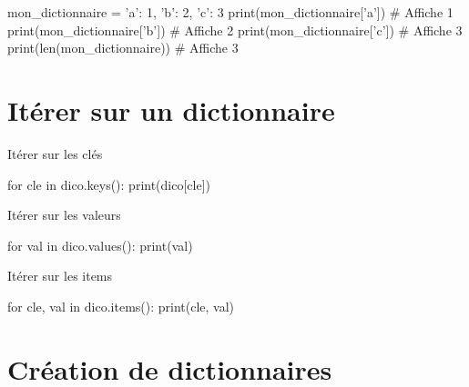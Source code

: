 \begin{propriete}{}
	\begin{CodePythontexAlt}[TaillePolice=\normalsize, Largeur=1\linewidth,Centre,PremLigne=1, Lignes=true,]{}
mon_dictionnaire = {'a': 1, 'b': 2, 'c': 3}
print(mon_dictionnaire['a'])  # Affiche 1
print(mon_dictionnaire['b'])  # Affiche 2
print(mon_dictionnaire['c'])  # Affiche 3
print(len(mon_dictionnaire))  # Affiche 3
		\end{CodePythontexAlt}
\end{propriete}

\section{Itérer sur un dictionnaire}


\begin{minipage}{0.31\linewidth}
	\begin{easybox}{Itérer sur les clés}{}
		\begin{CodePythontexAlt}[TaillePolice=\small, Largeur=1\linewidth,Centre,Lignes=false,PremLigne=1]{}
	for cle in dico.keys():
		print(dico[cle])
		\end{CodePythontexAlt}
	\end{easybox}
\end{minipage}\hfill
\begin{minipage}{0.33\linewidth}
	\begin{easybox}{Itérer sur les valeurs}{}
		\begin{CodePythontexAlt}[TaillePolice=\small, Largeur=1\linewidth,Centre,Lignes=false,PremLigne=1]{}
	for val in dico.values():
		print(val)
		\end{CodePythontexAlt}
	\end{easybox}
\end{minipage}\hfill
\begin{minipage}{0.36\linewidth}
	\begin{easybox}{Itérer sur les items}{}
		\begin{CodePythontexAlt}[TaillePolice=\small, Largeur=1\linewidth,Centre,Lignes=false,PremLigne=1]{}
	for cle, val in dico.items():
		print(cle, val)
		\end{CodePythontexAlt}
	\end{easybox}
\end{minipage}

\section{Création de dictionnaires}

